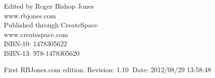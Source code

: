 \begin{titlepage}
\maketitle

\hspace{2in}

\vfill

\begin{centering}




\vfill

\vspace{0.1in}
Edited by Roger Bishop Jones\\
www.rbjones.com\\
\vspace{0.2in}
Published through CreateSpace\\
www.createspace.com\\
\vspace{0.2in}
ISBN-10: 1478305622\\
ISBN-13: 978-1478305620\\
\vspace{0.2in}

{\footnotesize

First RBJones.com edition. $ $Revision: 1.10 $~$Date: 2012/08/29 13:58:48 $ $


}%

\end{centering}


\thispagestyle{empty}
\end{titlepage}

{\parskip=0pt\tableofcontents}

\vfill


